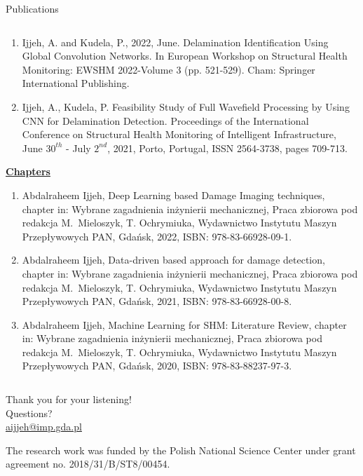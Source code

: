\documentclass[10pt,aspectratio=169,dvipsnames]{beamer} %
\begin{document}
\begin{frame}{Publications}
\begin{tiny}
\begin{columns}[T]
\begin{column}[t]{0.48\textwidth}
\begin{enumerate}
						\item Ijjeh, A. and Kudela, P., 2022, June. Delamination Identification Using Global Convolution Networks. 
						In European Workshop on Structural Health Monitoring: EWSHM 2022-Volume 3 (pp. 521-529). Cham: Springer International Publishing.		
						\item {Ijjeh, A.}, Kudela, P. Feasibility Study of Full Wavefield Processing by Using CNN for Delamination Detection. 
						Proceedings of the International Conference on Structural Health Monitoring of Intelligent
						Infrastructure, June \(30^{th}\) - July \(2^{nd}\), 2021, Porto, Portugal, ISSN 2564-3738, pages 709-713.
					\end{enumerate}		
					\underline{\textbf{Chapters}}					
					\begin{enumerate}
						\justifying
						\item {Abdalraheem Ijjeh}, Deep Learning based Damage Imaging techniques, chapter in: Wybrane zagadnienia
						inżynierii mechanicznej, Praca zbiorowa pod redakcja M.~Mieloszyk, T. Ochrymiuka, Wydawnictwo Instytutu
						Maszyn Przepływowych PAN, Gdańsk, 2022, ISBN: 978-83-66928-09-1.
						\item {Abdalraheem Ijjeh}, Data-driven based approach for damage detection, chapter in: Wybrane zagadnienia
						inżynierii mechanicznej, Praca zbiorowa pod redakcja M.~Mieloszyk, T. Ochrymiuka, Wydawnictwo Instytutu
						Maszyn Przepływowych PAN, Gdańsk, 2021, ISBN: 978-83-66928-00-8.				
						\item {Abdalraheem Ijjeh}, Machine Learning for SHM: Literature Review, chapter in: Wybrane zagadnienia
						inżynierii mechanicznej, Praca zbiorowa pod redakcja M.~Mieloszyk, T. Ochrymiuka, Wydawnictwo Instytutu
						Maszyn Przepływowych PAN, Gdańsk, 2020, ISBN: 978-83-88237-97-3.
					\end{enumerate}
				\end{column}		
			\end{columns}
		\end{tiny}
	\end{frame}	
	\setcounter{subfigure}{0}
	{
		\begin{frame}[standout]
			Thank you for your listening!\\ \vspace{12pt}
			Questions?\\ \vspace{12pt}
			\url{aijjeh@imp.gda.pl}
			\par\medskip
			\par\medskip
			\footnotesize
			The research work was funded by the Polish National Science Center under grant agreement no. 2018/31/B/ST8/00454.
		\end{frame}
	}
	
\end{document}
